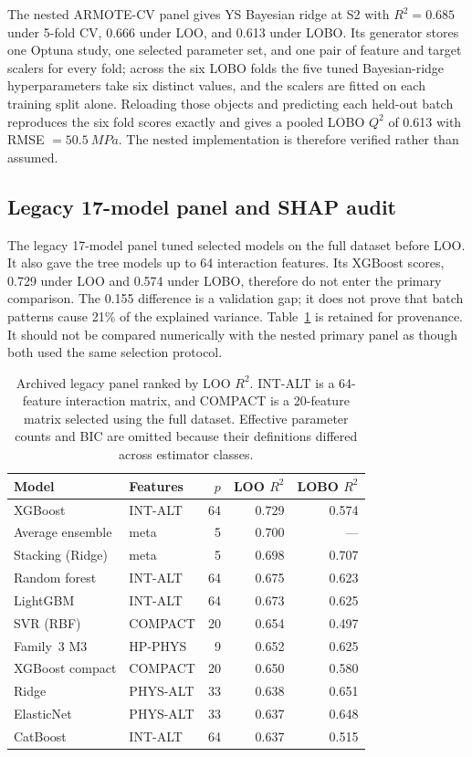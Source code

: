 \documentclass[a4paper,11pt]{article}
\begin{document}
The nested ARMOTE-CV panel gives YS Bayesian ridge at S2 with $R^2=0.685$ under 5-fold CV, 0.666 under LOO, and 0.613 under LOBO. Its generator stores one Optuna study, one selected parameter set, and one pair of feature and target scalers for every fold; across the six LOBO folds the five tuned Bayesian-ridge hyperparameters take six distinct values, and the scalers are fitted on each training split alone. Reloading those objects and predicting each held-out batch reproduces the six fold scores exactly and gives a pooled LOBO $Q^2$ of 0.613 with RMSE $=\SI{50.5}{MPa}$. The nested implementation is therefore verified rather than assumed.

\subsection{Legacy 17-model panel and SHAP audit}

The legacy 17-model panel tuned selected models on the full dataset before LOO. It also gave the tree models up to 64 interaction features. Its XGBoost scores, 0.729 under LOO and 0.574 under LOBO, therefore do not enter the primary comparison. The 0.155 difference is a validation gap; it does not prove that batch patterns cause 21\% of the explained variance. Table~\ref{tab:legacy} is retained for provenance. It should not be compared numerically with the nested primary panel as though both used the same selection protocol.

\begin{table}[H]
\centering
\caption{Archived legacy panel ranked by LOO $R^2$. INT-ALT is a 64-feature interaction matrix, and COMPACT is a 20-feature matrix selected using the full dataset. Effective parameter counts and BIC are omitted because their definitions differed across estimator classes.}
\label{tab:legacy}
\small
\begin{tabular}{llrrr}
\toprule
Model & Features & $p$ & LOO $R^2$ & LOBO $R^2$ \\
\midrule
XGBoost & INT-ALT & 64 & 0.729 & 0.574 \\
Average ensemble & meta & 5 & 0.700 & --- \\
Stacking (Ridge) & meta & 5 & 0.698 & 0.707 \\
Random forest & INT-ALT & 64 & 0.675 & 0.623 \\
LightGBM & INT-ALT & 64 & 0.673 & 0.625 \\
SVR (RBF) & COMPACT & 20 & 0.654 & 0.497 \\
Family~3 M3 & HP-PHYS & 9 & 0.652 & 0.625 \\
XGBoost compact & COMPACT & 20 & 0.650 & 0.580 \\
Ridge & PHYS-ALT & 33 & 0.638 & 0.651 \\
ElasticNet & PHYS-ALT & 33 & 0.637 & 0.648 \\
CatBoost & INT-ALT & 64 & 0.637 & 0.515 \\
\bottomrule
\end{tabular}
\end{table}
\end{document}
